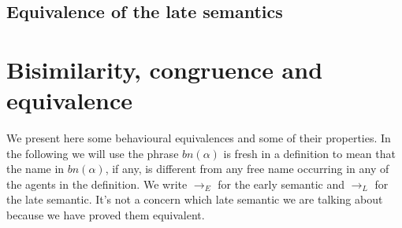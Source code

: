 % 
% 
\subsection{Equivalence of the late semantics}



\section{Bisimilarity, congruence and equivalence}

We present here some behavioural equivalences and some of their properties. In the following we will use the phrase $bn(\alpha)$ is fresh in a definition to mean that the name in $bn(\alpha)$, if any, is different from any free name occurring in any of the agents in the definition. We write $\rightarrow_{E}$ for the early semantic and $\rightarrow_{L}$ for the late semantic. It's not a concern which late semantic we are talking about because we have proved them equivalent.


